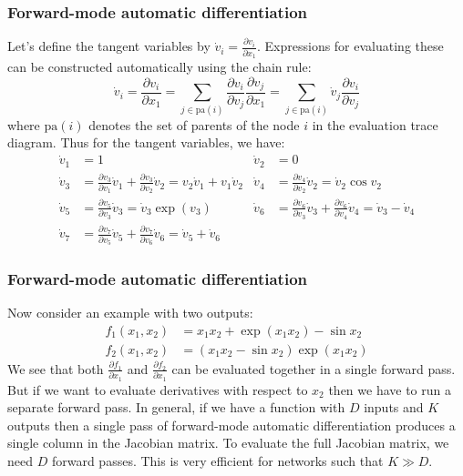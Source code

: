 \documentclass{beamer}
\begin{document}
\begin{frame}
    \frametitle{Forward-mode automatic differentiation}
    Let's define the tangent variables by $\dot{v}_{i}=\frac{\partial{}v_{i}}{\partial{}x_{1}}$. Expressions for evaluating these can be constructed automatically using the chain rule:
    \begin{equation*}
        \dot{v}_{i}=\frac{\partial{}v_{i}}{\partial{}x_{1}}=\sum_{j\in\mathrm{pa}(i)}\frac{\partial{}v_{i}}{\partial{}v_{j}}\frac{\partial{}v_{j}}{\partial{}x_{1}}=\sum_{j\in\mathrm{pa}(i)}\dot{v}_{j}\frac{\partial{}v_{i}}{\partial{}v_{j}}
    \end{equation*}
    where $\mathrm{pa}(i)$ denotes the set of parents of the node $i$ in the evaluation trace diagram. Thus for the tangent variables, we have:
    \begin{align*}
        \dot{v}_{1}&=1&\dot{v}_{2}&=0 \\
        \dot{v}_{3}&=\frac{\partial{}v_{3}}{\partial{}v_{1}}\dot{v}_{1}+\frac{\partial{}v_{3}}{\partial{}v_{2}}\dot{v}_{2}=v_{2}\dot{v}_{1}+v_{1}\dot{v}_{2}&\dot{v}_{4}&=\frac{\partial{}v_{4}}{\partial{}v_{2}}\dot{v}_{2}=\dot{v}_{2}\cos{}v_{2} \\
        \dot{v}_{5}&=\frac{\partial{}v_{5}}{\partial{}v_{3}}\dot{v}_{3}=\dot{v}_{3}\exp(v_{3})&\dot{v}_{6}&=\frac{\partial{}v_{6}}{\partial{}v_{3}}\dot{v}_{3}+\frac{\partial{}v_{6}}{\partial{}v_{4}}\dot{v}_{4}=\dot{v}_{3}-\dot{v}_{4} \\
        \dot{v}_{7}&=\frac{\partial{}v_{7}}{\partial{}v_{5}}\dot{v}_{5}+\frac{\partial{}v_{7}}{\partial{}v_{6}}\dot{v}_{6}=\dot{v}_{5}+\dot{v}_{6}
    \end{align*}
\end{frame}

\begin{frame}
    \frametitle{Forward-mode automatic differentiation}
    Now consider an example with two outputs:
    \begin{align*}
        f_{1}(x_{1},x_{2})&=x_{1}x_{2}+\exp(x_{1}x_{2})-\sin{}x_{2} \\
        f_{2}(x_{1},x_{2})&=(x_{1}x_{2}-\sin{}x_{2})\exp(x_{1}x_{2})
    \end{align*}
    We see that both $\frac{\partial{}f_{1}}{\partial{}x_{1}}$ and $\frac{\partial{}f_{2}}{\partial{}x_{1}}$ can be evaluated together in a single forward pass. But if we want to evaluate derivatives with respect to $x_{2}$ then we have to run a separate forward pass.
    \bigbreak
    In general, if we have a function with $D$ inputs and $K$ outputs then a single pass of forward-mode automatic differentiation produces a single column in the Jacobian matrix. To evaluate the full Jacobian matrix, we need $D$ forward passes. This is very efficient for networks such that $K\gg{}D$.
\end{frame}
\end{document}
